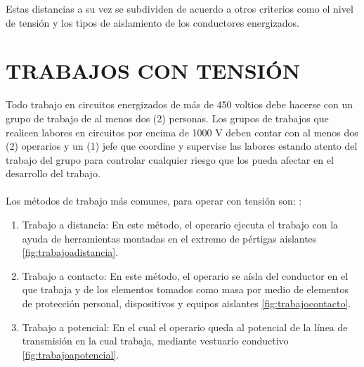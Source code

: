 \documentclass[a5paper]{book}%
\begin{document}
Estas distancias a su vez se subdividen de acuerdo a otros criterios como el nivel de tensión y los tipos de aislamiento de los conductores energizados.

\section{TRABAJOS CON TENSIÓN}

Todo trabajo en circuitos energizados de más de 450 voltios debe hacerse con un grupo de trabajo de al menos dos (2) personas. Los grupos de trabajos que realicen labores en circuitos por encima de 1000 V deben contar con al menos dos (2) operarios y un (1) jefe que coordine y supervise las labores estando atento del trabajo del grupo para controlar cualquier riesgo que los pueda afectar en
el desarrollo del trabajo.  \cite{RETIE2013}\\\\

Los métodos de trabajo más comunes, para operar con tensión son: \cite{RETIE2013}:

\begin{enumerate}
	\item Trabajo a distancia: En este método, el operario ejecuta
          el trabajo con la ayuda de herramientas montadas en el
          extremo de pértigas aislantes \ref{fig:trabajoadistancia}.
	\item Trabajo a contacto: En este método, el operario se aísla
          del conductor en el que trabaja y de los elementos tomados
          como masa por medio de elementos de protección personal,
          dispositivos y equipos aislantes \ref{fig:trabajocontacto}.
	\item Trabajo a potencial: En el cual el operario queda al
          potencial de la línea de transmisión en la cual trabaja,
          mediante vestuario conductivo \ref{fig:trabajoapotencial}.
        \end{enumerate}
\end{document}
